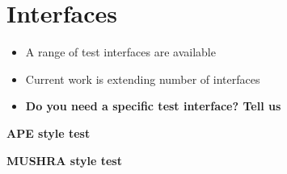 \vspace{-0.8cm}
\section{Interfaces}

\begin{itemize}
\item A range of test interfaces are available
\item Current work is extending number of interfaces
\item {\bf Do you need a specific test interface? Tell us}
\end{itemize}




 \centering
 \small
 \textbf{APE style test}
 
 \centering
 \small
 \textbf{MUSHRA style test}





